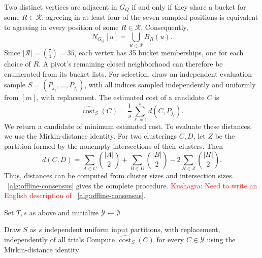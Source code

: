 \documentclass[11pt]{article}
\theoremstyle{definition}
\theoremstyle{remark}
\newcommand{\1}{\mathbf{1}}
\newcommand{\kushagra}[1]{\textcolor{red}{\newline Kushagra: #1}}
\begin{document}
Two distinct vertices are adjacent in $G_Q$ if and only if
they share a bucket for some $R\in\mathcal{R}$: agreeing in
at least four of the seven sampled positions is equivalent
to agreeing in every position of some $R\in\mathcal{R}$.
Consequently,
\[
    N_{G_Q}[u]
    =
    \bigcup_{R\in\mathcal{R}} B_R(u).
\]
Since $|\mathcal{R}|=\binom{7}{4}=35$, each vertex has
35 bucket memberships, one for each choice of $R$.
A pivot's remaining closed neighborhood can therefore
be enumerated from its bucket lists.
For selection, draw an independent evaluation sample
$S=(P_{j_1},\ldots,P_{j_s})$, with all indices sampled
independently and uniformly from $[m]$, with replacement.
The estimated cost of a candidate $C$ is
\[
    \widehat{\operatorname{cost}}_S(C)
        =\frac{1}{s}\sum_{\ell=1}^{s}d(C,P_{j_\ell}).
\]
We return a candidate of minimum estimated cost. To evaluate these distances, we use the Mirkin-distance
identity. For two clusterings $C,D$, let $Z$ be the partition
formed by the nonempty intersections of their clusters.
Then
\[
    d(C,D)
        =\sum_{A\in C}\binom{|A|}{2}
         +\sum_{B\in D}\binom{|B|}{2}
         -2\sum_{H\in Z}\binom{|H|}{2}.
\]
Thus, distances can be computed from cluster sizes and
intersection sizes. ~\cref{alg:offline-consensus}
gives the complete procedure.
\kushagra{Need to write an English description of ~\cref{alg:offline-consensus}.}
\begin{algorithm}[t]
\caption{Near-linear-time offline consensus clustering}
\label{alg:offline-consensus}
\DontPrintSemicolon
\KwIn{Input clusterings $\mathcal P=(P_1,\ldots,P_m)$ on $V$,
      accuracy $\varepsilon\in(0,1]$, and failure probability
      $\zeta\in(0,1)$.}

Set $T,s$ as above and initialize $\mathcal Y\gets\emptyset$\;


Draw $S$ as $s$ independent uniform input partitions,
with replacement, independently of all trials\;
Compute $\widehat{\operatorname{cost}}_S(C)$
for every $C\in\mathcal Y$ using the Mirkin-distance identity\;

\;
\end{algorithm}
\end{document}

